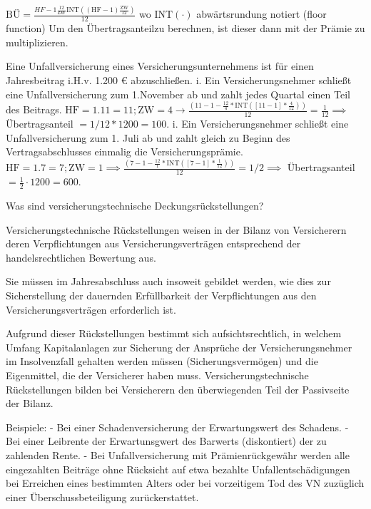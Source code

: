 \( \text{BÜ} = \frac{HF - 1 \frac{12}{\text{ZW}}\text{INT}((\text{HF} - 1)\frac{\text{ZW}}{12})}{12} \)
wo \( \text{INT}(\cdot) \) abwärtsrundung notiert (floor function)
Um den Übertragsanteilzu berechnen, ist dieser dann mit der Prämie zu multiplizieren.

Eine Unfallversicherung eines Versicherungsunternehmens ist für einen Jahresbeitrag i.H.v. 1.200 € abzuschließen.
i. Ein Versicherungsnehmer schließt eine Unfallversicherung zum 1.November ab und zahlt jedes Quartal einen Teil des Beitrags.
\( \text{HF} = 1.11 = 11; \text{ZW} = 4 → \frac{(11-1-\frac{12}{4}*\text{INT}([11-1]*\frac{4}{12}))}{12}=\frac{1}{12} \implies\) Übertragsanteil \( = 1/12*1200 = 100 \).
i. Ein Versicherungsnehmer schließt eine Unfallversicherung zum 1. Juli ab und zahlt gleich zu Beginn des Vertragsabschlusses einmalig die
Versicherungsprämie.
\(\text{HF} =1.7=7; \text{ZW}=1 \implies \frac{(7-1-\frac{12}{1}*\text{INT}([7-1]*\frac{1}{12}))}{12}=1/2 \implies\) Übertragsanteil \(= \frac{1}{2}\cdot1200=600\).


Was sind versicherungstechnische Deckungsrückstellungen?


Versicherungstechnische Rückstellungen weisen in der Bilanz von Versicherern deren Verpflichtungen aus Versicherungsverträgen entsprechend 
der handelsrechtlichen Bewertung aus. 

Sie müssen im Jahresabschluss auch insoweit gebildet werden, 
wie dies zur Sicherstellung der dauernden Erfüllbarkeit der Verpflichtungen aus den Versicherungsverträgen erforderlich ist. 

Aufgrund dieser Rückstellungen bestimmt sich aufsichtsrechtlich, in welchem Umfang Kapitalanlagen zur Sicherung 
der Ansprüche der Versicherungsnehmer im Insolvenzfall gehalten werden müssen (Sicherungsvermögen) 
und die Eigenmittel, die der Versicherer haben muss. 
Versicherungstechnische Rückstellungen bilden bei Versicherern den überwiegenden Teil der Passivseite der Bilanz.

Beispiele:
- Bei einer Schadenversicherung der Erwartungswert des Schadens.
- Bei einer Leibrente der Erwartunsgwert des Barwerts (diskontiert) der zu zahlenden Rente.
- Bei Unfallversicherung mit Prämienrückgewähr werden alle eingezahlten Beiträge ohne Rücksicht auf etwa bezahlte Unfallentschädigungen bei
  Erreichen eines bestimmten Alters oder bei vorzeitigem Tod des VN zuzüglich einer Überschussbeteiligung zurückerstattet.

